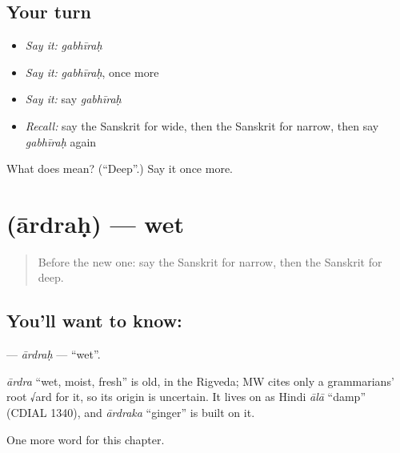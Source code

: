 \subsection*{Your turn}
\begin{itemize}
\raggedright
  \item \emph{Say it:} \emph{gabhīraḥ}
  \item \emph{Say it:} \emph{gabhīraḥ}, once more
  \item \emph{Say it:} say \emph{gabhīraḥ}
  \item \emph{Recall:} say the Sanskrit for wide, then the Sanskrit for narrow, then say \emph{gabhīraḥ} again
\end{itemize}

\begin{tcolorbox}[breakable,colback=teal!4,colframe=teal!35!black,title={Before you move on}]
What does  mean? (\textquotedblleft{}Deep\textquotedblright{}.) Say it once more.
\end{tcolorbox}
\section[\texorpdfstring{\sk{आर्द्रः} (ārdraḥ)}{आर्द्रः (ārdraḥ)}]{ (ārdraḥ) — wet}

\label{lesson:SA-C126-ardrah}



\begin{quote}
Before the new one: say the Sanskrit for narrow, then the Sanskrit for deep.
\end{quote}

\subsection*{You'll want to know: }
\textbf{} — \emph{ārdraḥ} — \textquotedblleft{}wet\textquotedblright{}.

\begin{cousinweb}
\emph{ārdra} \textquotedblleft{}wet, moist, fresh\textquotedblright{} is old, in the Rigveda; MW cites only a grammarians' root √ard for it, so its origin is uncertain. It lives on as Hindi \emph{ālā} \textquotedblleft{}damp\textquotedblright{} (CDIAL 1340), and \emph{ārdraka} \textquotedblleft{}ginger\textquotedblright{} is built on it.
\end{cousinweb}

\begin{grammarlens}[title={What you've built}]
One more word for this chapter.
\end{grammarlens}

